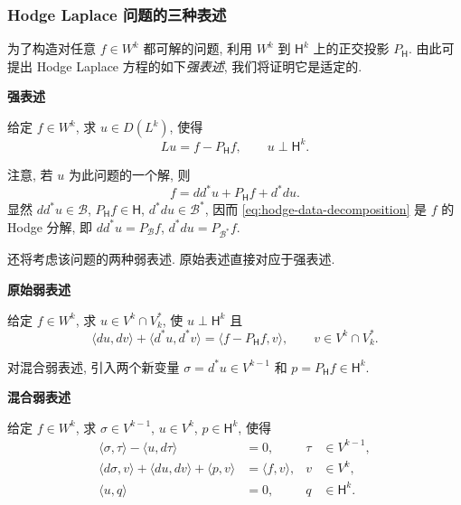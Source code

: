 \subsubsection{{Hodge Laplace 问题的三种表述}}\label{subsec:hodge-three-formulations}

{为了构造对任意 $f\in W^k$ 都可解的问题, 利用 $W^k$ 到 $\mathsf H^k$ 上的正交投影 $P_{\mathsf H}$. 由此可提出 Hodge Laplace 方程的如下\emph{强表述}, 我们将证明它是适定的.}

\medskip\noindent\textbf{{强表述}}\par
{给定 $f\in W^k$, 求 $u\in D(L^k)$, 使得}
\begin{equation}\label{eq:hodge-strong-formulation}
Lu=f-P_{\mathsf H}f,\qquad u\perp\mathsf H^k.
\end{equation}

{注意, 若 $u$ 为此问题的一个解, 则}
\begin{equation}\label{eq:hodge-data-decomposition}
f=dd^*u+P_{\mathsf H}f+d^*du.
\end{equation}
{显然 $dd^*u\in\mathcal B$, $P_{\mathsf H}f\in\mathsf H$, $d^*du\in\mathcal B^*$, 因而 \eqref{eq:hodge-data-decomposition} 是 $f$ 的 Hodge 分解, 即 $dd^*u=P_{\mathcal B}f$, $d^*du=P_{\mathcal B^*}f$.}

{还将考虑该问题的两种弱表述. 原始表述直接对应于强表述.}

\medskip\noindent\textbf{{原始弱表述}}\par
{给定 $f\in W^k$, 求 $u\in V^k\cap V_k^*$, 使 $u\perp\mathsf H^k$ 且}
\begin{equation}\label{eq:hodge-primal-formulation}
\langle du,dv\rangle+\langle d^*u,d^*v\rangle=\langle f-P_{\mathsf H}f,v\rangle,\qquad v\in V^k\cap V_k^*.
\end{equation}

{对混合弱表述, 引入两个新变量 $\sigma=d^*u\in V^{k-1}$ 和 $p=P_{\mathsf H}f\in\mathsf H^k$.}

\medskip\noindent\textbf{{混合弱表述}}\par
{给定 $f\in W^k$, 求 $\sigma\in V^{k-1}$, $u\in V^k$, $p\in\mathsf H^k$, 使得}
\begin{equation}\label{eq:hodge-mixed-formulation}
\begin{aligned}
\langle\sigma,\tau\rangle-\langle u,d\tau\rangle&=0,&\tau&\in V^{k-1},\\
\langle d\sigma,v\rangle+\langle du,dv\rangle+\langle p,v\rangle&=\langle f,v\rangle,&v&\in V^k,\\
\langle u,q\rangle&=0,&q&\in\mathsf H^k.
\end{aligned}
\end{equation}

